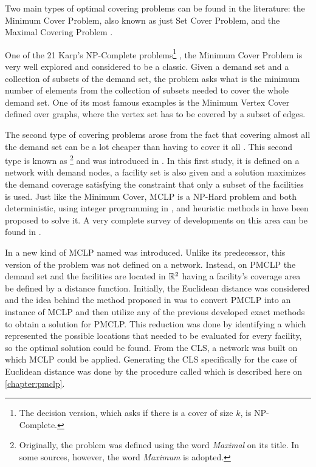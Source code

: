 Two main types of optimal covering problems can be found in the literature: the Minimum Cover Problem, also known as just Set Cover Problem, and the Maximal Covering Problem \cite{karatas}. 

One of the 21 Karp's NP-Complete problems\footnote{The decision version, which asks if there is a cover of size $k$, is NP-Complete.} \cite{karp}, the Minimum Cover Problem is very well explored and considered to be a classic. 
Given a demand set and a collection of subsets of the demand set, the problem asks what is the minimum number of elements from the collection of subsets needed to cover the whole demand set. One of its most famous examples is the Minimum Vertex Cover defined over graphs, where the vertex set has to be covered by a subset of edges.

The second type of covering problems arose from the fact that covering almost all the demand set can be a lot cheaper than having to cover it all \cite{garcia}. This second type is known as \footnote{Originally, the problem was defined using the word \textit{Maximal} on its title. In some sources, however, the word \textit{Maximum} is adopted.} and was introduced in . In this first study, it is defined on a network with demand nodes, a facility set is also given and a solution maximizes the demand coverage satisfying the constraint that only a subset of the facilities is used. Just like the Minimum Cover, MCLP is a NP-Hard problem \cite{hatta:2013} and both deterministic, using integer programming in , and heuristic methods in  have been proposed to solve it. A very complete survey of developments on this area can be found in .

In  a new kind of MCLP named  was introduced. Unlike its predecessor, this version of the problem was not defined on a network. Instead, on PMCLP the demand set and the facilities are located in $\mathbb{R}^2$ having a facility's coverage area be defined by a distance function. 
Initially, the Euclidean distance was considered and the idea behind the method proposed in  was to convert PMCLP into an instance of MCLP and then utilize any of the previous developed exact methods to obtain a solution for PMCLP. This reduction was done by identifying a  which represented the possible locations that needed to be evaluated for every facility, so the optimal solution could be found. From the CLS, a network was built on which MCLP could be applied. Generating the CLS specifically for the case of Euclidean distance was done by the procedure called  which is described here on \autoref{chapter:pmclp}.

